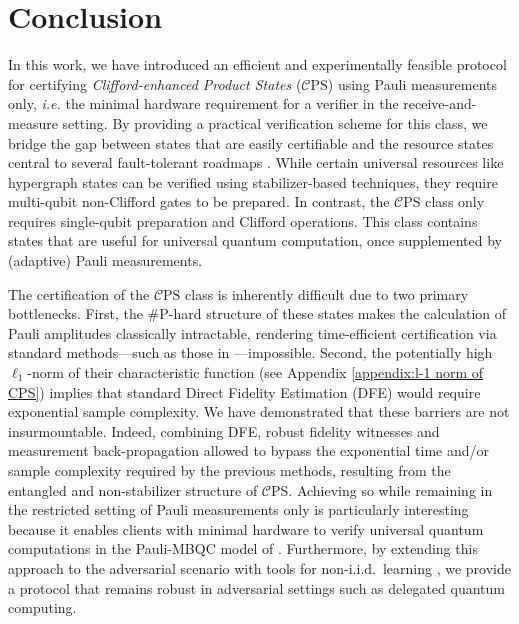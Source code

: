 \documentclass[a4paper,twocolumn,11pt,unpublished]{quantumarticle}
\newcommand{\CEPS}{$\mathcal C$PS}
\newcommand{\mCEPS}{\mathcal{C}\text{PS}}
\begin{document}
\section{Conclusion}
\label{section:conclusion}

In this work, we have introduced an efficient and experimentally feasible protocol for certifying \emph{Clifford-enhanced Product States} ($\mCEPS$) using Pauli measurements only, \textit{i.e.} the minimal hardware requirement for a verifier in the receive-and-measure setting. By providing a practical verification scheme for this class, we bridge the gap between states that are easily certifiable and the resource states central to several fault-tolerant roadmaps \cite{DBMA25breaking, G23cleaner, AAAA22suppressing, MGCM25ibm, GSJ24magic}. 
While certain universal resources like hypergraph states can be verified using stabilizer-based techniques, they require multi-qubit non-Clifford gates to be prepared.
In contrast, the $\mCEPS$ class only requires single-qubit preparation and Clifford operations.  This class contains states that are useful for universal quantum computation, once supplemented by (adaptive) Pauli measurements.



The certification of the $\mCEPS$ class is inherently difficult due to two primary bottlenecks. First, the \#P-hard structure of these states makes the calculation of Pauli amplitudes classically intractable, rendering time-efficient certification via standard methods—such as those in \cite{HPS24certifying, GHO25few}—impossible. Second, the potentially high $\ell_1$-norm of their characteristic function (see Appendix \ref{appendix:l-1 norm of CPS}) implies that standard Direct Fidelity Estimation (DFE) \cite{FOS24optimal} would require exponential sample complexity. We have demonstrated that these barriers are not insurmountable. Indeed, combining DFE, robust fidelity witnesses and measurement back-propagation allowed to bypass the exponential time and/or sample complexity required by the previous methods, resulting from the entangled and non-stabilizer structure of \CEPS. Achieving so while remaining in the restricted setting of Pauli measurements only is particularly interesting because it enables clients with minimal hardware to verify universal quantum computations in the Pauli-MBQC model of \cite{SDKO07direct}.
Furthermore, by extending this approach to the adversarial scenario with tools for non-i.i.d.\ learning \cite{FKMO24learning}, we provide a protocol that remains robust in adversarial settings such as delegated quantum computing.
\end{document}

